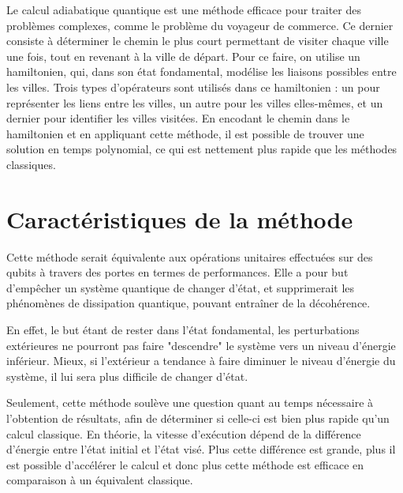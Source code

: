 \documentclass{article}
\begin{document}
Le calcul adiabatique quantique est une méthode efficace pour traiter des problèmes complexes, comme le problème du voyageur de commerce. Ce dernier consiste à déterminer le chemin le plus court permettant de visiter chaque ville une fois, tout en revenant à la ville de départ. Pour ce faire, on utilise un hamiltonien, qui, dans son état fondamental, modélise les liaisons possibles entre les villes. Trois types d'opérateurs sont utilisés dans ce hamiltonien : un pour représenter les liens entre les villes, un autre pour les villes elles-mêmes, et un dernier pour identifier les villes visitées. En encodant le chemin dans le hamiltonien et en appliquant cette méthode, il est possible de trouver une solution en temps polynomial, ce qui est nettement plus rapide que les méthodes classiques. \cite{arxiv2018quantum}


\newpage
\section{Caractéristiques de la méthode}

Cette méthode serait équivalente aux opérations unitaires effectuées sur des qubits à travers des portes en termes de performances. Elle a pour but d'empêcher un système quantique de changer d'état, et supprimerait les phénomènes de dissipation quantique, pouvant entraîner de la décohérence.\medskip

\noindent En effet, le but étant de rester dans l'état fondamental, les perturbations extérieures ne pourront pas faire "descendre" le système vers un niveau d'énergie inférieur. Mieux, si l'extérieur a tendance à faire diminuer le niveau d'énergie du système, il lui sera plus difficile de changer d'état. 

\bigskip

\noindent Seulement, cette méthode soulève une question quant au temps nécessaire à l'obtention de résultats, afin de déterminer si celle-ci est bien plus rapide qu'un calcul classique. En théorie, la vitesse d'exécution dépend de la différence d'énergie entre l'état initial et l'état visé. Plus cette différence est grande, plus il est possible d'accélérer le calcul et donc plus cette méthode est efficace en comparaison à un équivalent classique.

\printbibliography
\end{document}
